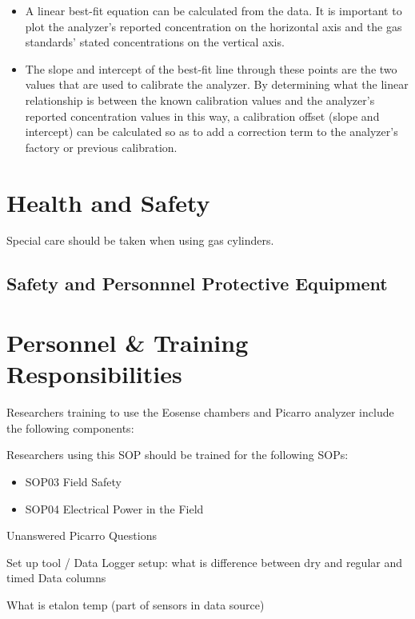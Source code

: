 \documentclass[12pt]{../SOP3}\usepackage[]{graphicx}\usepackage[]{color}
\begin{document}
\begin{itemize}
\item A linear best-fit equation can be calculated from the data. It is important to plot the analyzer’s reported concentration on the horizontal axis and the gas standards’ stated concentrations on the vertical axis.
\item The slope and intercept of the best-fit line through these points are the two values that are used to calibrate the analyzer. By determining what the linear relationship is between the known calibration values and the analyzer’s reported concentration values in this way, a calibration offset (slope and intercept) can be calculated so as to add a correction term to the analyzer’s factory or previous calibration. 
\end{itemize}
 
\section{Health and Safety}

Special care should be taken when using gas cylinders. 

\subsection*{Safety and Personnnel Protective Equipment}


\section{Personnel \& Training Responsibilities}

Researchers training to use the Eosense chambers and Picarro analyzer include the following components: 



Researchers using this SOP should be trained for the following SOPs:

\begin{itemize}
  \item SOP03 Field Safety
  \item SOP04 Electrical Power in the Field
\end{itemize}

Unanswered Picarro Questions

\NP Set up tool / Data Logger setup: what is difference between dry and regular and timed Data columns

\NP What is etalon temp (part of sensors in data source)
\end{document}
